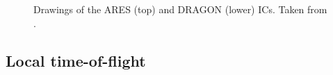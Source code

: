 \begin{figure}
\centering
{}
\caption{Drawings of the ARES (top) and DRAGON (lower) ICs. Taken from \cite{coud03,vock08}.}
\label{fig:ICs}
\end{figure}


\subsection{Local time-of-flight}


